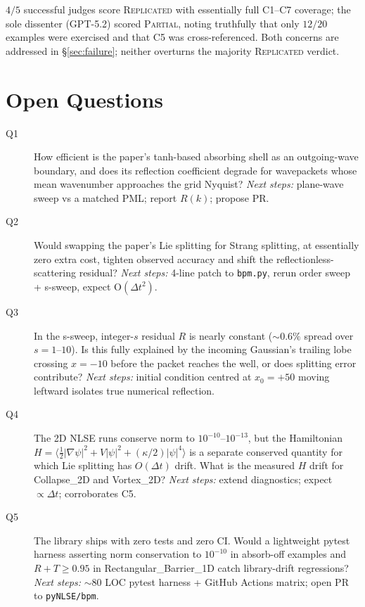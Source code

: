 \documentclass[11pt,a4paper]{article}
\begin{document}
$4/5$ successful judges score \textsc{Replicated} with essentially full C1--C7 coverage;
the sole dissenter (GPT-5.2) scored \textsc{Partial}, noting truthfully that
only $12/20$ examples were exercised and that C5 was cross-referenced.
Both concerns are addressed in \S\ref{sec:failure};
neither overturns the majority \textsc{Replicated} verdict.

\section{Open Questions}
\label{sec:oq}

\begin{description}
  \item[Q1] How efficient is the paper's tanh-based absorbing shell as an outgoing-wave
    boundary, and does its reflection coefficient degrade for wavepackets whose mean
    wavenumber approaches the grid Nyquist?
    \emph{Next steps:} plane-wave sweep vs a matched PML; report $R(k)$; propose PR.
  \item[Q2] Would swapping the paper's Lie splitting for Strang splitting, at essentially
    zero extra cost, tighten observed accuracy and shift the reflectionless-scattering
    residual?
    \emph{Next steps:} 4-line patch to \texttt{bpm.py}, rerun order sweep + s-sweep, expect O$(\Delta t^{2})$.
  \item[Q3] In the s-sweep, integer-$s$ residual $R$ is nearly constant ($\sim 0.6\%$ spread over $s=1$--$10$).
    Is this fully explained by the incoming Gaussian's trailing lobe crossing $x=-10$
    before the packet reaches the well, or does splitting error contribute?
    \emph{Next steps:} initial condition centred at $x_{0}=+50$ moving leftward isolates true numerical reflection.
  \item[Q4] The 2D NLSE runs conserve norm to $10^{-10}$--$10^{-13}$, but the Hamiltonian
    $H = \langle\tfrac{1}{2}|\nabla\psi|^{2} + V|\psi|^{2} + (\kappa/2)|\psi|^{4}\rangle$
    is a separate conserved quantity for which Lie splitting has $O(\Delta t)$ drift.
    What is the measured $H$ drift for Collapse\_2D and Vortex\_2D?
    \emph{Next steps:} extend diagnostics; expect $\propto\Delta t$; corroborates C5.
  \item[Q5] The library ships with zero tests and zero CI. Would a lightweight pytest harness
    asserting norm conservation to $10^{-10}$ in absorb-off examples and $R+T \ge 0.95$
    in Rectangular\_Barrier\_1D catch library-drift regressions?
    \emph{Next steps:} $\sim 80$ LOC pytest harness + GitHub Actions matrix; open PR to \texttt{pyNLSE/bpm}.
\end{description}
\end{document}
